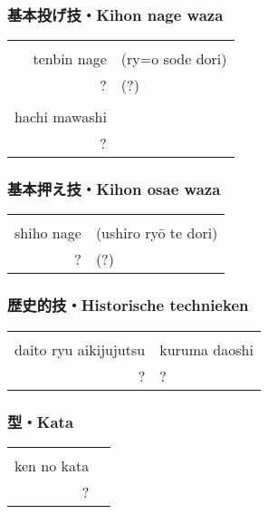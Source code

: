 \subsubsection{基本投げ技・Kihon nage waza}
\begin{table}[H]
\begin{center}
\begin{tabular}{rl}
    \ruby{}{}\ruby{}{} & \\
    tenbin nage & (ry={o} sode dori)\\
    ? & (?)\\
    \hline
    \ruby{}{} &\\
    hachi mawashi &\\
    ? &
\end{tabular}
\end{center}
\label{kyuu_2_kihon_nage_waza}
\end{table}

\subsubsection{基本押え技・Kihon osae waza}
\begin{table}[H]
\begin{center}
\begin{tabular}{rl}
    \ruby{}{}\ruby{}{} & \\
    shiho nage & (ushiro ry\={o} te dori)\\
    ? & (?)
\end{tabular}
\end{center}
\label{kyuu_2_kihon_osae_waza}
\end{table}

\subsubsection{歴史的技・Historische technieken}
\begin{table}[H]
\begin{center}
\begin{tabular}{rl}
    \ruby{}{}\ruby{}{} & \\
    daito ryu aikijujutsu & kuruma daoshi\\
    ? & ?
\end{tabular}
\end{center}
\label{kyuu_2_historic}
\end{table}

\subsubsection{型・Kata}
\begin{table}[H]
\begin{center}
\begin{tabular}{rl}
    \ruby{}{}\ruby{}{}\\
    ken no kata\\
    ?
\end{tabular}
\end{center}
\label{kyuu_2_kata}
\end{table}

